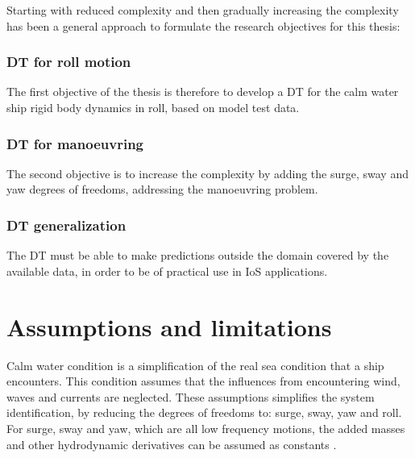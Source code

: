 \bigskip
\noindent Starting with reduced complexity and then gradually increasing the complexity has been a general approach to formulate the research objectives for this thesis:   


\subsubsection*{DT for roll motion}
The first objective of the thesis is therefore to develop a DT for the calm water ship rigid body dynamics in roll, based on model test data.

\subsubsection*{DT for manoeuvring}
The second objective is to increase the complexity by adding the surge, sway and yaw degrees of freedoms, addressing the manoeuvring problem.

\subsubsection*{DT generalization}
The DT must be able to make predictions outside the domain covered by the available data, in order to be of practical use in IoS applications.

\section{Assumptions and limitations}
Calm water condition is a simplification of the real sea condition that a ship encounters. This condition assumes that the influences from encountering wind, waves and currents are neglected. These assumptions simplifies the system identification, by reducing the degrees of freedoms to: surge, sway, yaw and roll. For surge, sway and yaw, which are all low frequency motions, the added masses and other hydrodynamic derivatives can be assumed as constants \cite{fossen_handbook_2021}.  

